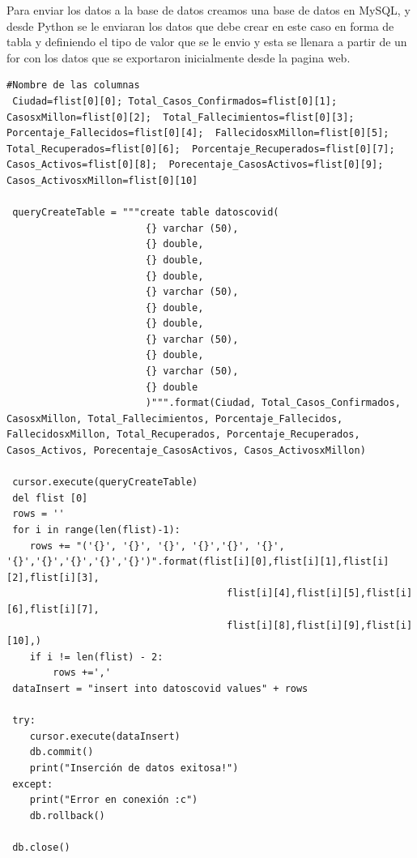 \documentclass[conference,compsoc,onecolumn]{IEEEtran}
\begin{document}
Para enviar los datos a la base de datos creamos una base de datos en MySQL, y desde Python se le enviaran los datos que debe crear en este caso en forma de tabla y definiendo el tipo de valor que se le envio y esta se llenara a partir de un for con los datos que se exportaron inicialmente desde la pagina web.


\lstset{language=Python, breaklines=true, basicstyle=\footnotesize}
\lstset{numbers=left, numberstyle=\tiny, stepnumber=1, numbersep=-2pt}
\begin{lstlisting}[frame=single,caption={Código base de datos },captionpos=b]
 #Nombre de las columnas
 Ciudad=flist[0][0]; Total_Casos_Confirmados=flist[0][1]; CasosxMillon=flist[0][2];  Total_Fallecimientos=flist[0][3]; Porcentaje_Fallecidos=flist[0][4];  FallecidosxMillon=flist[0][5]; Total_Recuperados=flist[0][6];  Porcentaje_Recuperados=flist[0][7]; Casos_Activos=flist[0][8];  Porecentaje_CasosActivos=flist[0][9]; Casos_ActivosxMillon=flist[0][10]

 queryCreateTable = """create table datoscovid(
                        {} varchar (50),
                        {} double,
                        {} double,
                        {} double,
                        {} varchar (50),
                        {} double,
                        {} double,
                        {} varchar (50),
                        {} double,
                        {} varchar (50),
                        {} double
                        )""".format(Ciudad, Total_Casos_Confirmados, CasosxMillon, Total_Fallecimientos, Porcentaje_Fallecidos, FallecidosxMillon, Total_Recuperados, Porcentaje_Recuperados, Casos_Activos, Porecentaje_CasosActivos, Casos_ActivosxMillon)

 cursor.execute(queryCreateTable)
 del flist [0]
 rows = ''
 for i in range(len(flist)-1):
    rows += "('{}', '{}', '{}', '{}','{}', '{}', '{}','{}','{}','{}','{}')".format(flist[i][0],flist[i][1],flist[i][2],flist[i][3],
                                      flist[i][4],flist[i][5],flist[i][6],flist[i][7],
                                      flist[i][8],flist[i][9],flist[i][10],)
    if i != len(flist) - 2:
        rows +=','
 dataInsert = "insert into datoscovid values" + rows

 try:
    cursor.execute(dataInsert)
    db.commit()
    print("Inserción de datos exitosa!")
 except:
    print("Error en conexión :c")
    db.rollback()

 db.close()
\end{lstlisting}
\label{cod}
\end{document}

